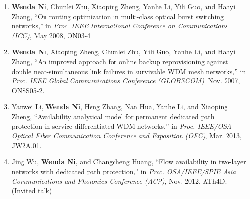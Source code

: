 \documentclass[letterpaper,11pt]{article}
\begin{document}
\begin{CJK}{UTF8}{gbsn}
\begin{enumerate}
\item
\textbf{Wenda Ni}, Chunlei Zhu, Xiaoping Zheng, Yanhe Li, Yili Guo, and Hanyi Zhang, ``On routing optimization in multi-class optical burst switching networks,'' in \textit{Proc. IEEE International Conference on Communications (ICC)}, May 2008, ON03-4.

\item
\textbf{Wenda Ni}, Xiaoping Zheng, Chunlei Zhu, Yili Guo, Yanhe Li, and Hanyi Zhang, ``An improved approach for online backup reprovisioning against double near-simultaneous link failures in survivable WDM mesh networks,'' in \textit{Proc. IEEE Global Communications Conference (GLOBECOM)}, Nov. 2007, ONSS05-2.

\item
Yanwei Li, \textbf{Wenda Ni}, Heng Zhang, Nan Hua, Yanhe Li, and Xiaoping Zheng, ``Availability analytical model for permanent dedicated path protection in service differentiated WDM networks,'' in \textit{Proc. IEEE/OSA Optical Fiber Communication Conference and Exposition (OFC)}, Mar. 2013, JW2A.01.

\item
Jing Wu, \textbf{Wenda Ni}, and Changcheng Huang, ``Flow availability in two-layer networks with dedicated path protection,'' in \textit{Proc. OSA/IEEE/SPIE Asia Communications and Photonics Conference (ACP)}, Nov. 2012, ATh4D. (Invited talk)


\end{enumerate}
\end{CJK}
\end{document}
